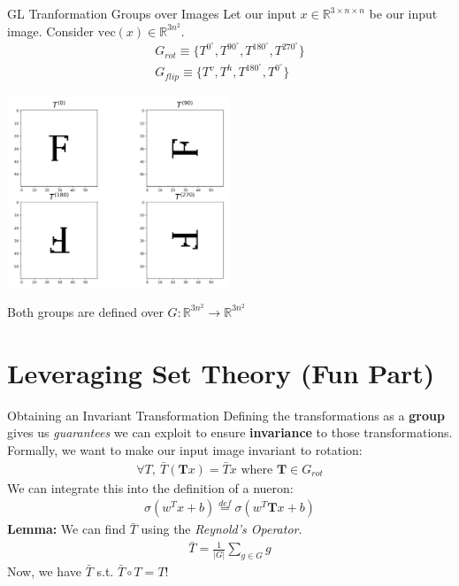 \documentclass{beamer}
\begin{document}
\begin{frame}{GL Tranformation Groups over Images}
	Let our input $x \in \mathbb{R}^{3 \times n \times n}$ be our input image. Consider $\text{vec}(x) \in \mathbb{R}^{3n^2}$. \pause
	\begin{gather}
		G_{rot} \equiv \{T^{0^\circ}, T^{90^\circ}, T^{180^\circ}, T^{270^\circ}\} \\
		G_{flip} \equiv \{T^{v}, T^{h}, T^{180^\circ}, T^{0^\circ}\}
	\end{gather} \pause
	\vspace{-2em}
	\begin{center}
		\includegraphics[width=0.5\textwidth]{img/f_rots.png}
	\end{center} \pause
	Both groups are defined over $G: \mathbb{R}^{3n^2} \rightarrow \mathbb{R}^{3n^2}$
\end{frame}

\section{Leveraging Set Theory (Fun Part)}
\begin{frame}{Obtaining an Invariant Transformation}
	Defining the transformations as a \textbf{group} gives us \textit{guarantees} we can exploit to ensure \textbf{invariance} to those transformations. \pause \newline \\

	Formally, we want to make our input image invariant to rotation:
	\begin{gather}
		\forall T,\ \bar{T}(\bm{T}x) = \bar{T}x \text{ where } \bm{T} \in G_{rot}
	\end{gather} \pause
	We can integrate this into the definition of a nueron:
	\begin{gather}
		\sigma(w^Tx + b) \stackrel{def}{=} \sigma(w^T \bm{T} x + b)
	\end{gather} \pause
	\textbf{Lemma:} We can find $\bar{T}$ using the \textit{Reynold's Operator}.
	\begin{gather}
		\bar{T} = \frac{1}{|G|}\sum_{g \in G}g
	\end{gather} \pause
	Now, we have $\bar{T}$ s.t. $\bar{T} \circ T = T$!
\end{frame}
\end{document}

